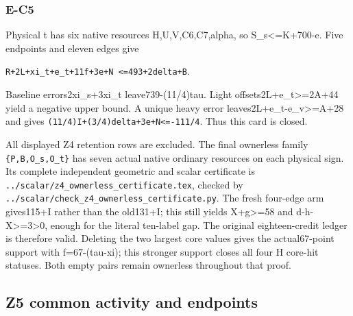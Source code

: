 \documentclass[10pt,a4paper]{article}
\theoremstyle{definition}
\begin{document}
\hypertarget{e-c5}{%
\subsubsection{E-C5}\label{e-c5}}

Physical t has six native resources H,\allowbreak{}U,\allowbreak{}V,\allowbreak{}C6,\allowbreak{}C7,\allowbreak{}alpha,\allowbreak{} so
S\_\allowbreak{}s\textless=\allowbreak{}K+\allowbreak{}700-e. Five endpoints and eleven edges give

\texttt{R+\allowbreak{}2L+\allowbreak{}xi\_\allowbreak{}\allowbreak{}t+\allowbreak{}e\_\allowbreak{}\allowbreak{}t+\allowbreak{}11f+\allowbreak{}3e+\allowbreak{}N <=\allowbreak{}493+\allowbreak{}2delta+\allowbreak{}B}.

Baseline errors2xi\_\allowbreak{}s+\allowbreak{}3xi\_\allowbreak{}t leave739-(11/4)tau. Light
offsets2L+\allowbreak{}e\_\allowbreak{}t\textgreater=\allowbreak{}2A+\allowbreak{}44 yield a negative upper bound. A unique
heavy error leaves2L+\allowbreak{}e\_\allowbreak{}t-e\_\allowbreak{}v\textgreater=\allowbreak{}A+\allowbreak{}28 and gives
\texttt{(11/\allowbreak{}4)I+\allowbreak{}(3/\allowbreak{}4)delta+\allowbreak{}3e+\allowbreak{}N<=\allowbreak{}-111/\allowbreak{}4}. Thus this
card is closed.

All displayed Z4 retention rows are excluded. The final ownerless family
\texttt{\{P,\allowbreak{}B,\allowbreak{}O\_\allowbreak{}\allowbreak{}s,\allowbreak{}O\_\allowbreak{}\allowbreak{}t\}} has seven actual native
ordinary resources on each physical sign. Its complete independent
geometric and scalar certificate is
\texttt{../\allowbreak{}scalar/\allowbreak{}z4\_\allowbreak{}\allowbreak{}ownerless\_\allowbreak{}\allowbreak{}certificate.tex},\allowbreak{}
checked by
\texttt{../\allowbreak{}scalar/\allowbreak{}check\_\allowbreak{}\allowbreak{}z4\_\allowbreak{}\allowbreak{}ownerless\_\allowbreak{}\allowbreak{}certificate.py}.
The fresh four-edge arm gives115+\allowbreak{}I rather than the old131+\allowbreak{}I; this still
yields X+\allowbreak{}g\textgreater=\allowbreak{}58 and d-h-X\textgreater=\allowbreak{}3\textgreater0,\allowbreak{} enough
for the literal ten-label gap. The original eighteen-credit ledger is
therefore valid. Deleting the two largest core values gives the
actual67-point support with f=\allowbreak{}67-(tau-xi); this stronger support closes
all four H core-hit statuses. Both empty pairs remain ownerless
throughout that proof.

\hypertarget{z5-common-activity-and-endpoints}{%
\subsection{Z5 common activity and
endpoints}\label{z5-common-activity-and-endpoints}}
\end{document}
